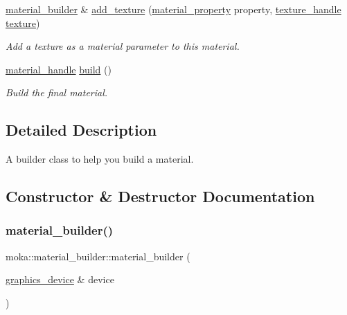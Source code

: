 \begin{DoxyCompactItemize}
\mbox{\hyperlink{classmoka_1_1material__builder}{material\+\_\+builder}} \& \mbox{\hyperlink{classmoka_1_1material__builder_abb53367df5be8f441a886462075713c5}{add\+\_\+texture}} (\mbox{\hyperlink{namespacemoka_aa5549e36b096ef61aaa3dbcdade25195}{material\+\_\+property}} property, \mbox{\hyperlink{structmoka_1_1texture__handle}{texture\+\_\+handle}} \mbox{\hyperlink{namespacemoka_aed2224bc0e5b79e57a8975ded94ee1aaa6d788fcb39cecfd54da7b065a8b75d1a}{texture}})
\begin{DoxyCompactList}\small\item\em Add a texture as a material parameter to this material. \end{DoxyCompactList}\item 
\mbox{\hyperlink{structmoka_1_1material__handle}{material\+\_\+handle}} \mbox{\hyperlink{classmoka_1_1material__builder_a38aeb602a54aff9711e14ed59d686d86}{build}} ()
\begin{DoxyCompactList}\small\item\em Build the final material. \end{DoxyCompactList}\end{DoxyCompactItemize}


\subsection{Detailed Description}
A builder class to help you build a material. 

\subsection{Constructor \& Destructor Documentation}
\mbox{\label{classmoka_1_1material__builder_a5ff32c4d8f82b4cc91abb9fb4e2b2f38}} 
\subsubsection{\texorpdfstring{material\_builder()}{material\_builder()}}
{\footnotesize\ttfamily moka\+::material\+\_\+builder\+::material\+\_\+builder (\begin{DoxyParamCaption}\item[{\mbox{\hyperlink{classmoka_1_1graphics__device}{graphics\+\_\+device}} \&}]{device }\end{DoxyParamCaption})\hspace{0.3cm}{\ttfamily [explicit]}}



